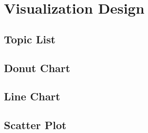 \chapter{Visualization Design}



\section{Topic List}



\section{Donut Chart}



\section{Line Chart}



\section{Scatter Plot}



